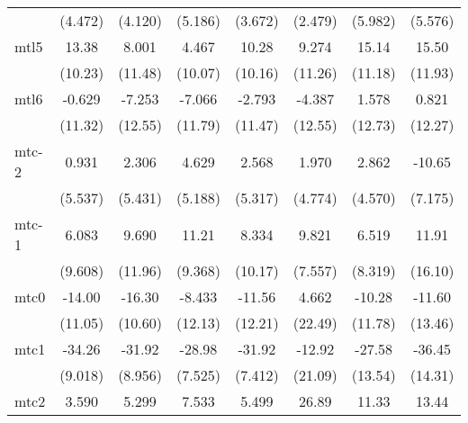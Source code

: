 \documentclass{article}
\begin{document}
{\begin{longtable}{l*{7}{c}}
                &  (4.472)         &  (4.120)         &  (5.186)         &  (3.672)         &  (2.479)         &  (5.982)         &  (5.576)         \\
mtl5            &    13.38         &    8.001         &    4.467         &    10.28         &    9.274         &    15.14         &    15.50         \\
                &  (10.23)         &  (11.48)         &  (10.07)         &  (10.16)         &  (11.26)         &  (11.18)         &  (11.93)         \\
mtl6            &   -0.629         &   -7.253         &   -7.066         &   -2.793         &   -4.387         &    1.578         &    0.821         \\
                &  (11.32)         &  (12.55)         &  (11.79)         &  (11.47)         &  (12.55)         &  (12.73)         &  (12.27)         \\
mtc-2           &    0.931         &    2.306         &    4.629         &    2.568         &    1.970         &    2.862         &   -10.65         \\
                &  (5.537)         &  (5.431)         &  (5.188)         &  (5.317)         &  (4.774)         &  (4.570)         &  (7.175)         \\
mtc-1           &    6.083         &    9.690         &    11.21         &    8.334         &    9.821         &    6.519         &    11.91         \\
                &  (9.608)         &  (11.96)         &  (9.368)         &  (10.17)         &  (7.557)         &  (8.319)         &  (16.10)         \\
mtc0            &   -14.00         &   -16.30         &   -8.433         &   -11.56         &    4.662         &   -10.28         &   -11.60         \\
                &  (11.05)         &  (10.60)         &  (12.13)         &  (12.21)         &  (22.49)         &  (11.78)         &  (13.46)         \\
mtc1            &   -34.26\sym{*}  &   -31.92\sym{*}  &   -28.98\sym{*}  &   -31.92\sym{**} &   -12.92         &   -27.58         &   -36.45         \\
                &  (9.018)         &  (8.956)         &  (7.525)         &  (7.412)         &  (21.09)         &  (13.54)         &  (14.31)         \\
mtc2            &    3.590         &    5.299         &    7.533         &    5.499         &    26.89         &    11.33         &    13.44         \\

\end{longtable}}
\end{document}
